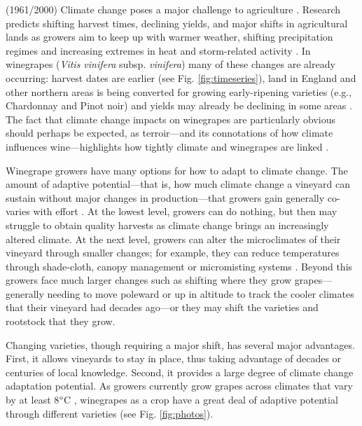 \documentclass[11pt,letterpaper]{article}
\begin{document}
\newpage
(1961/2000)
Climate change poses a major challenge to agriculture \citep{Porter2014}. Research predicts shifting harvest times, declining yields, and major shifts in agricultural lands as growers aim to keep up with warmer weather, shifting precipitation regimes and increasing extremes in heat and storm-related activity \citep{ipcc2013}. In winegrapes (\emph{Vitis vinifera} subsp. \emph{vinifera}) many of these changes are already occurring: harvest dates are earlier (see Fig. \ref{fig:timeseries}), land in England and other northern areas is being converted for growing early-ripening varieties (e.g., Chardonnay and Pinot noir) and yields may already be declining in some areas \citep{webb2012,ollat2016}. The fact that climate change impacts on winegrapes are particularly obvious should perhaps be expected, as terroir---and its connotations of how climate influences wine---highlights how tightly climate and winegrapes are linked \citep{Gladstones2011}. 

Winegrape growers have many options for how to adapt to climate change. The amount of adaptive potential---that is, how much climate change a vineyard can sustain without major changes in production---that growers gain generally co-varies with effort \citep{kimmy2012}. At the lowest level, growers can do nothing, but then may struggle to obtain quality harvests as climate change brings an increasingly altered climate. At the next level, growers can alter the microclimates of their vineyard through smaller changes; for example, they can reduce temperatures through shade-cloth, canopy management or micromisting systems \citep{ollat2016,parker2016,vanLeeuwen2016}. Beyond this growers face much larger changes such as shifting where they grow grapes---generally needing to move poleward or up in altitude to track the cooler climates that their vineyard had decades ago---or they may shift the varieties and rootstock that they grow. 

Changing varieties, though requiring a major shift, has several major advantages. First, it allows vineyards to stay in place, thus taking advantage of decades or centuries of local knowledge. Second, it provides a large degree of climate change adaptation potential. As growers currently grow grapes across climates that vary by at least 8$\degree$C \citep{kees2013}, winegrapes as a crop have a great deal of adaptive potential through different varieties (see Fig. \ref{fig:photos}).
\end{document}
